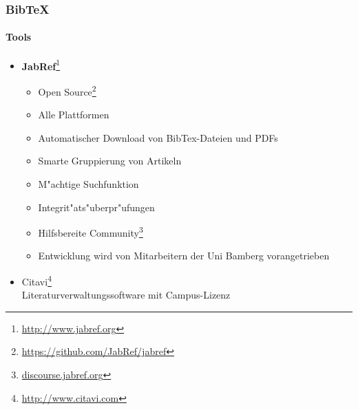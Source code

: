 \begin{frame}
\frametitle{BibTeX}
\framesubtitle{Tools}
\begin{itemize}
\item \textbf{JabRef}\footnote{\url{http://www.jabref.org}}
\begin{itemize}
	\item Open Source\footnote{\url{https://github.com/JabRef/jabref}}
	\item Alle Plattformen
	\item Automatischer Download von BibTex-Dateien und PDFs
	\item Smarte Gruppierung von Artikeln
	\item M"achtige Suchfunktion
	\item Integrit"ats"uberpr"ufungen
	\item Hilfsbereite Community\footnote{\url{discourse.jabref.org}}
	\item Entwicklung wird von Mitarbeitern der Uni Bamberg vorangetrieben
\end{itemize}
	
\item Citavi\footnote{\url{http://www.citavi.com}}\\
Literaturverwaltungssoftware mit Campus-Lizenz

\end{itemize}
\end{frame}
